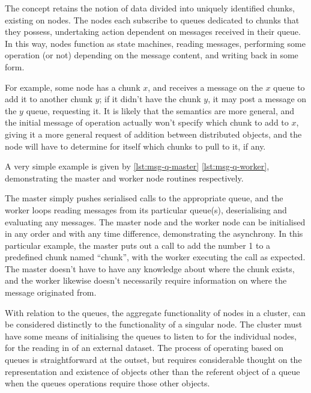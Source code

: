 The concept retains the notion of data divided into uniquely identified chunks, existing on nodes.
The nodes each subscribe to queues dedicated to chunks that they possess, undertaking action dependent on messages received in their queue.
In this way, nodes function as state machines, reading messages, performing some operation (or not) depending on the message content, and writing back in some form.

For example, some node has a chunk \(x\), and receives a message on the \(x\) queue to add it to another chunk \(y\); if it didn't have the chunk \(y\), it may post a message on the \(y\) queue, requesting it.
It is likely that the semantics are more general, and the initial message of operation actually won't specify which chunk to add to \(x\), giving it a more general request of addition between distributed objects, and the node will have to determine for itself which chunks to pull to it, if any.

A very simple example is given by \cref{lst:msg-q-master} \cref{lst:msg-q-worker}, demonstrating the master and worker node routines respectively.



The master simply pushes serialised calls to the appropriate queue, and the worker loops reading messages from its particular queue(s), deserialising and evaluating any messages.
The master node and the worker node can be initialised in any order and with any time difference, demonstrating the asynchrony.
In this particular example, the master puts out a call to add the number 1 to a predefined chunk named ``chunk'', with the worker executing the call as expected.
The master doesn't have to have any knowledge about where the chunk exists, and the worker likewise doesn't necessarily require information on where the message originated from.

With relation to the queues, the aggregate functionality of nodes in a cluster, can be considered distinctly to the functionality of a singular node.
The cluster must have some means of initialising the queues to listen to for the individual nodes, for the reading in of an external dataset.
The process of operating based on queues is straightforward at the outset, but requires considerable thought on the representation and existence of objects other than the referent object of a queue when the queues operations require those other objects.

